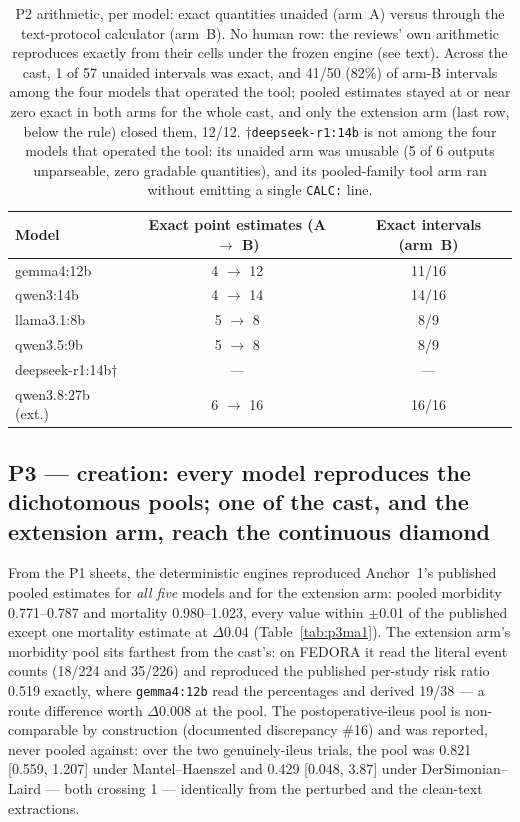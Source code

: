 \documentclass[11pt]{article}
\begin{document}
\begin{table}[H]
\centering\small
\caption{P2 arithmetic, per model: exact quantities unaided (arm~A) versus through the text-protocol calculator (arm~B). No human row: the reviews' own arithmetic reproduces exactly from their cells under the frozen engine (see text). Across the cast, 1 of 57 unaided intervals was exact, and 41/50 (82\%) of arm-B intervals among the four models that operated the tool; pooled estimates stayed at or near zero exact in both arms for the whole cast, and only the extension arm (last row, below the rule) closed them, 12/12. $\dagger$\texttt{deepseek-r1:14b} is not among the four models that operated the tool: its unaided arm was unusable (5 of 6 outputs unparseable, zero gradable quantities), and its pooled-family tool arm ran without emitting a single \texttt{CALC:} line.}
\label{tab:p2}
\begin{tabular}{lcc}
\toprule
Model & Exact point estimates (A $\rightarrow$ B) & Exact intervals (arm~B) \\
\midrule
gemma4:12b & 4 $\rightarrow$ 12 & 11/16 \\
qwen3:14b & 4 $\rightarrow$ 14 & 14/16 \\
llama3.1:8b & 5 $\rightarrow$ 8 & 8/9 \\
qwen3.5:9b & 5 $\rightarrow$ 8 & 8/9 \\
deepseek-r1:14b$\dagger$ & --- & --- \\
\midrule
qwen3.8:27b (ext.) & 6 $\rightarrow$ 16 & 16/16 \\
\bottomrule
\end{tabular}
\end{table}

\subsection{P3 --- creation: every model reproduces the dichotomous pools; one of the cast, and the extension arm, reach the continuous diamond}
From the P1 sheets, the deterministic engines reproduced Anchor~1's published pooled estimates for \emph{all five} models and for the extension arm: pooled morbidity 0.771--0.787 and mortality 0.980--1.023, every value within $\pm$0.01 of the published except one mortality estimate at $\Delta$0.04 (Table~\ref{tab:p3ma1}). The extension arm's morbidity pool sits farthest from the cast's: on FEDORA it read the literal event counts (18/224 and 35/226) and reproduced the published per-study risk ratio 0.519 exactly, where \texttt{gemma4:12b} read the percentages and derived 19/38 --- a route difference worth $\Delta$0.008 at the pool. The postoperative-ileus pool is non-comparable by construction (documented discrepancy \#16) and was reported, never pooled against: over the two genuinely-ileus trials, the pool was 0.821 [0.559, 1.207] under Mantel--Haenszel and 0.429 [0.048, 3.87] under DerSimonian--Laird --- both crossing 1 --- identically from the perturbed and the clean-text extractions.
\end{document}
